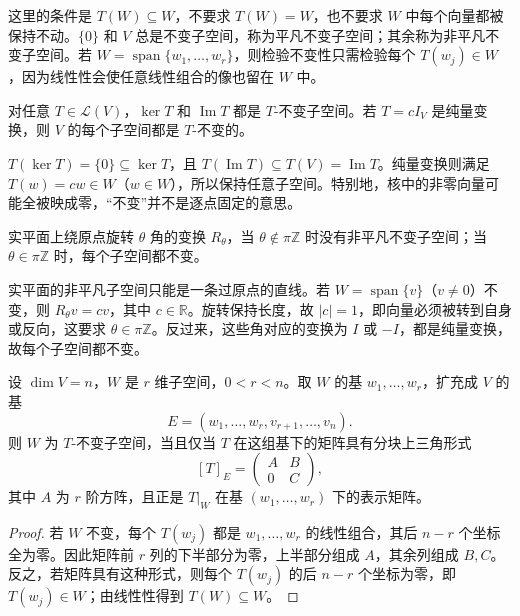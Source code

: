 这里的条件是 $T(W)\subseteq W$，不要求 $T(W)=W$，也不要求 $W$ 中每个向量都被保持不动。$\{0\}$ 和 $V$ 总是不变子空间，称为平凡不变子空间；其余称为非平凡不变子空间。若 $W=\operatorname{span}\{w_1,\ldots,w_r\}$，则检验不变性只需检验每个 $T(w_j)\in W$，因为线性性会使任意线性组合的像也留在 $W$ 中。

\begin{example}
对任意 $T\in\mathcal L(V)$，$\ker T$ 和 $\operatorname{Im}T$ 都是 $T$-不变子空间。若 $T=cI_V$ 是纯量变换，则 $V$ 的每个子空间都是 $T$-不变的。
\end{example}

\begin{solve}
$T(\ker T)=\{0\}\subseteq\ker T$，且 $T(\operatorname{Im}T)\subseteq T(V)=\operatorname{Im}T$。纯量变换则满足 $T(w)=cw\in W$（$w\in W$），所以保持任意子空间。特别地，核中的非零向量可能全被映成零，“不变”并不是逐点固定的意思。
\end{solve}

\begin{example}
实平面上绕原点旋转 $\theta$ 角的变换 $R_\theta$，当 $\theta\notin\pi\mathbb Z$ 时没有非平凡不变子空间；当 $\theta\in\pi\mathbb Z$ 时，每个子空间都不变。
\end{example}

\begin{solve}
实平面的非平凡子空间只能是一条过原点的直线。若 $W=\operatorname{span}\{v\}$（$v\ne0$）不变，则 $R_\theta v=cv$，其中 $c\in\mathbb R$。旋转保持长度，故 $|c|=1$，即向量必须被转到自身或反向，这要求 $\theta\in\pi\mathbb Z$。反过来，这些角对应的变换为 $I$ 或 $-I$，都是纯量变换，故每个子空间都不变。
\end{solve}

\begin{theorem}
\label{thm:invariant-subspace-block-triangular}
设 $\dim V=n$，$W$ 是 $r$ 维子空间，$0<r<n$。取 $W$ 的基 $w_1,\ldots,w_r$，扩充成 $V$ 的基
\[
    E=(w_1,\ldots,w_r,v_{r+1},\ldots,v_n).
\]
则 $W$ 为 $T$-不变子空间，当且仅当 $T$ 在这组基下的矩阵具有分块上三角形式
\begin{equation}
\label{eq:invariant-subspace-block-triangular}
    [T]_E=\begin{pmatrix}A&B\\0&C\end{pmatrix},
\end{equation}
其中 $A$ 为 $r$ 阶方阵，且正是 $T|_W$ 在基 $(w_1,\ldots,w_r)$ 下的表示矩阵。
\end{theorem}

\begin{proof}
若 $W$ 不变，每个 $T(w_j)$ 都是 $w_1,\ldots,w_r$ 的线性组合，其后 $n-r$ 个坐标全为零。因此矩阵前 $r$ 列的下半部分为零，上半部分组成 $A$，其余列组成 $B,C$。反之，若矩阵具有这种形式，则每个 $T(w_j)$ 的后 $n-r$ 个坐标为零，即 $T(w_j)\in W$；由线性性得到 $T(W)\subseteq W$。
\end{proof}

